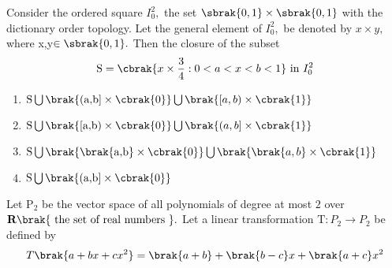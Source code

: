 \iffalse
\chapter{2019}
\author{AI24BTECH11032}
\section{ma}
\fi
    \item Consider the ordered square $I_{0}^{2},$ the set $\sbrak{0,1}\times\sbrak{0,1}$ with the dictionary order topology. Let the general element of   $I_{0}^{2},$ be denoted by $x\times y,$ where x,y$\in\sbrak{0,1}.$ Then the closure of the subset
    \begin{align*}
        \text{S}=\cbrak{x\times\frac{3}{4}:0<a<x<b<1}\text{ in } I_{0}^{2}
    \end{align*}
\begin{multicols}{2}
    \begin{enumerate}
         \item $\text{S}\bigcup\brak{(\text{a,b}]\times\cbrak{0}}\bigcup\brak{[a,b)\times\cbrak{1}}$
         \item  $\text{S}\bigcup\brak{[\text{a,b})\times\cbrak{0}}\bigcup\brak{(a,b]\times\cbrak{1}}$
         \item $\text{S}\bigcup\brak{\brak{\text{a,b}}\times\cbrak{0}}\bigcup\brak{\brak{a,b}\times\cbrak{1}}$
        \item $\text{S}\bigcup\brak{(\text{a,b}]\times\cbrak{0}}$
    \end{enumerate}
\end{multicols}   
\bigskip
\item Let $\text{P}_{2}$ be the vector space of all polynomials of degree at most $2$ over $\textbf{R}\brak{\text{ the set of real numbers }}.$ Let a linear transformation  $\text{T}:P_{2}\to P_{2}$ be defined by 
\begin{align*}
    T\brak{a+bx+cx^{2}}=\brak{a+b}+\brak{b-c}x+\brak{a+c}x^{2}
\end{align*}

